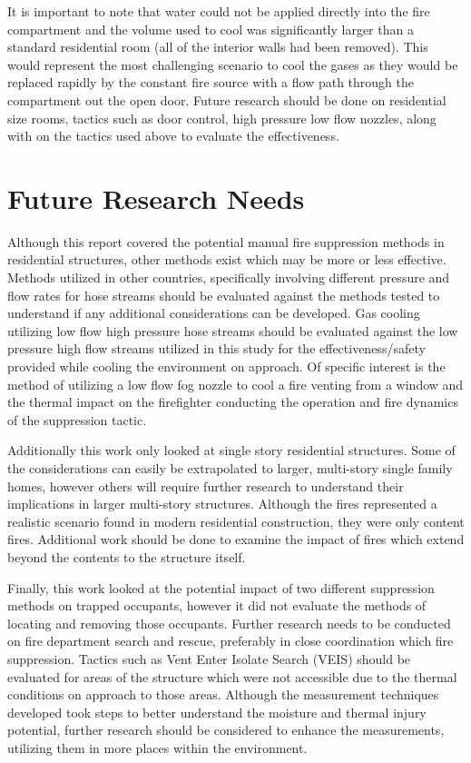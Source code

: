 \documentclass[12pt,oneside]{book}
\begin{document}
It is important to note that water could not be applied directly into the fire compartment and the volume used to cool was significantly larger than a standard residential room (all of the interior walls had been removed). This would represent the most challenging scenario to cool the gases as they would be replaced rapidly by the constant fire source with a flow path through the compartment out the open door. Future research should be done on residential size rooms, tactics such as door control, high pressure low flow nozzles, along with on the tactics used above to evaluate the effectiveness.  

\chapter{Future Research Needs}

Although this report covered the potential manual fire suppression methods in residential structures, other methods exist which may be more or less effective. Methods utilized in other countries, specifically involving different pressure and flow rates for hose streams should be evaluated against the methods tested to understand if any additional considerations can be developed. Gas cooling utilizing low flow high pressure hose streams should be evaluated against the low pressure high flow streams utilized in this study for the effectiveness/safety provided while cooling the environment on approach. Of specific interest is the method of utilizing a low flow fog nozzle to cool a fire venting from a window and the thermal impact on the firefighter conducting the operation and fire dynamics of the suppression tactic.

Additionally this work only looked at single story residential structures. Some of the considerations can easily be extrapolated to larger, multi-story single family homes, however others will require further research to understand their implications in larger multi-story structures. Although the fires represented a realistic scenario found in modern residential construction, they were only content fires. Additional work should be done to examine the impact of fires which extend beyond the contents to the structure itself. 

Finally, this work looked at the potential impact of two different suppression methods on trapped occupants, however it did not evaluate the methods of locating and removing those occupants. Further research needs to be conducted on fire department search and rescue, preferably in close coordination which fire suppression. Tactics such as Vent Enter Isolate Search (VEIS) should be evaluated for areas of the structure which were not accessible due to the thermal conditions on approach to those areas. Although the measurement techniques developed took steps to better understand the moisture and thermal injury potential, further research should be considered to enhance the measurements, utilizing them in more places within the environment. 
 
\end{document}
